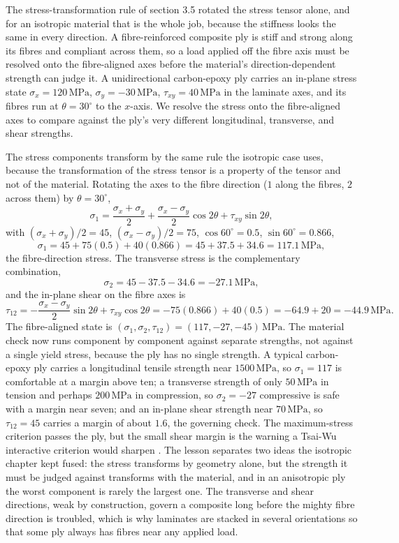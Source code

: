 The stress-transformation rule of section 3.5 rotated the stress tensor
alone, and for an isotropic material that is the whole job, because the
stiffness looks the same in every direction. A fibre-reinforced composite
ply is stiff and strong along its fibres and compliant across them, so a
load applied off the fibre axis must be resolved onto the fibre-aligned
axes before the material's direction-dependent strength can judge it. A
unidirectional carbon-epoxy ply carries an in-plane stress state
$\sigma_x = 120\,\text{MPa}$, $\sigma_y = -30\,\text{MPa}$, $\tau_{xy} =
40\,\text{MPa}$ in the laminate axes, and its fibres run at $\theta =
30^\circ$ to the $x$-axis. We resolve the stress onto the fibre-aligned
axes to compare against the ply's very different longitudinal, transverse,
and shear strengths.

The stress components transform by the same rule the isotropic case uses,
because the transformation of the stress tensor is a property of the
tensor and not of the material. Rotating the axes to the fibre direction
($1$ along the fibres, $2$ across them) by $\theta = 30^\circ$,
\[
\sigma_1 = \frac{\sigma_x + \sigma_y}{2} + \frac{\sigma_x - \sigma_y}{2}
\cos 2\theta + \tau_{xy}\sin 2\theta,
\]
with $(\sigma_x + \sigma_y)/2 = 45$, $(\sigma_x - \sigma_y)/2 = 75$,
$\cos 60^\circ = 0.5$, $\sin 60^\circ = 0.866$,
\[
\sigma_1 = 45 + 75(0.5) + 40(0.866) = 45 + 37.5 + 34.6 = 117.1\,\text{
MPa},
\]
the fibre-direction stress. The transverse stress is the complementary
combination,
\[
\sigma_2 = 45 - 37.5 - 34.6 = -27.1\,\text{MPa},
\]
and the in-plane shear on the fibre axes is
\[
\tau_{12} = -\frac{\sigma_x - \sigma_y}{2}\sin 2\theta + \tau_{xy}\cos
2\theta = -75(0.866) + 40(0.5) = -64.9 + 20 = -44.9\,\text{MPa}.
\]
The fibre-aligned state is $(\sigma_1, \sigma_2, \tau_{12}) = (117, -27,
-45)\,\text{MPa}$. The material check now runs component by component
against separate strengths, not against a single yield stress, because
the ply has no single strength. A typical carbon-epoxy ply carries a
longitudinal tensile strength near $1500\,\text{MPa}$, so $\sigma_1 =
117$ is comfortable at a margin above ten; a transverse strength of only
$50\,\text{MPa}$ in tension and perhaps $200\,\text{MPa}$ in compression,
so $\sigma_2 = -27$ compressive is safe with a margin near seven; and an
in-plane shear strength near $70\,\text{MPa}$, so $\tau_{12} = 45$ carries
a margin of about $1.6$, the governing check. The maximum-stress
criterion passes the ply, but the small shear margin is the warning a
Tsai-Wu interactive criterion would sharpen \cite[ch.~5]{text:chawla-composites}.
The lesson separates two ideas the isotropic chapter kept fused: the
stress transforms by geometry alone, but the strength it must be judged
against transforms with the material, and in an anisotropic ply the worst
component is rarely the largest one. The transverse and shear directions,
weak by construction, govern a composite long before the mighty fibre
direction is troubled, which is why laminates are stacked in several
orientations so that some ply always has fibres near any applied load.

